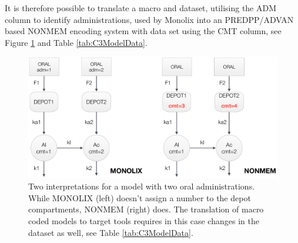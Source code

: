 It is therefore possible to translate a macro and dataset, utilising the ADM column to identify 
administrations, used by Monolix into an PREDPP/ADVAN based NONMEM encoding 
system with data set using the CMT column, see Figure \ref{fig:ComplexModel_Rules} and
Table \ref{tab:C3ModelData}.

\begin{figure}[h!]
\centering
 \includegraphics[width=140mm]{pics/ComplexModel_Rules.pdf}
\caption{Two interpretations for a model with two oral administrations.
While MONOLIX (left) doesn't assign a number to the depot compartments, 
NONMEM (right) does. The translation of macro coded models to target tools 
requires in this case changes in the dataset as well, see Table \ref{tab:C3ModelData}.}
\label{fig:ComplexModel_Rules}
\end{figure}


